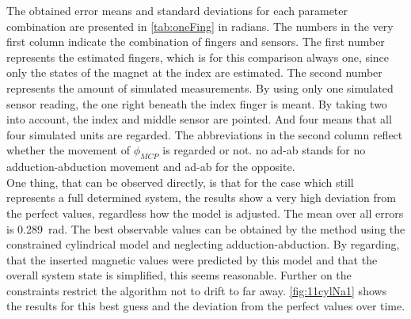 The obtained error means and standard deviations for each parameter combination are presented in \ref{tab:oneFing} in radians. The numbers in the very first column indicate the combination of fingers and sensors. The first number represents the estimated fingers, which is for this comparison always one, since only the states of the magnet at the index are estimated. The second number represents the amount of simulated measurements. By using only one simulated sensor reading, the one right beneath the index finger is meant. By taking two into account, the index and middle sensor are pointed. And four means that all four simulated units are regarded. The abbreviations in the second column reflect whether the movement of $ \phi_{MCP} $ is regarded or not. \grqq no ad-ab \grqq stands for no adduction-abduction movement and \grqq ad-ab \grqq for the opposite. \\
One thing, that can be observed directly, is that for the case \grqq which still represents a full determined system, the results show a very high deviation from the perfect values, regardless how the model is adjusted. The mean over all errors is \SI{0.289}{\radian}. The best observable values can be obtained by the method using the constrained cylindrical model and neglecting adduction-abduction. By regarding, that the inserted magnetic values were predicted by this model and that the overall system state is simplified, this seems reasonable. Further on the constraints restrict the algorithm not to drift to far away. \ref{fig:11cylNa1} shows the results for this best guess and the deviation from the perfect values over time. 
